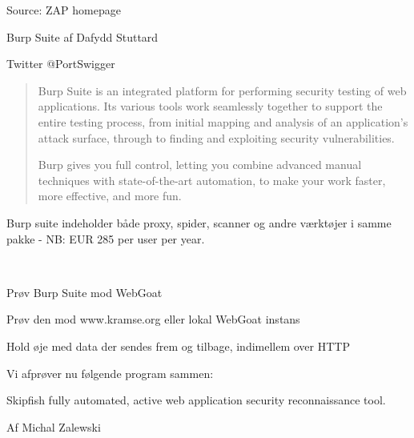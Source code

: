 \documentclass[20pt,landscape,a4paper,footrule]{foils}
\begin{document}
Source: ZAP homepage 






\begin{list1}
\item Burp Suite af Dafydd Stuttard 
\item Twitter @PortSwigger
\end{list1}



\begin{quote}
Burp Suite is an integrated platform for performing security testing of web applications. Its various tools work seamlessly together to support the entire testing process, from initial mapping and analysis of an application's attack surface, through to finding and exploiting security vulnerabilities.

Burp gives you full control, letting you combine advanced manual techniques with state-of-the-art automation, to make your work faster, more effective, and more fun.
\end{quote}

Burp suite indeholder både proxy, spider, scanner og andre værktøjer i samme pakke - NB: EUR 285 per user per year.

\\



\begin{list1}
\item Prøv Burp Suite mod WebGoat
\item Prøv den mod www.kramse.org eller lokal WebGoat instans
\item Hold øje med data der sendes frem og tilbage, indimellem over HTTP
\end{list1}




\begin{list1}
\item Vi afprøver nu følgende program sammen:
\item Skipfish fully automated, active web application security reconnaissance tool.
\item Af Michal Zalewski 
\end{list1}
\end{document}
